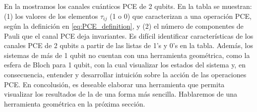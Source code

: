 En la  mostramos los canales 
cuánticos PCE de 2 qubits. En la tabla se muestran: 
(1) los valores de los elementos $\tau_{ij}$ (1 o 0) que caracterizan 
a una operación PCE, según la definición en \eqref{eq:PCE_definition},
y (2) el número de componentes de Pauli que el canal PCE
deja invariantes. Es difícil identificar características de los canales 
PCE de 2 qubits a partir de las listas de 1's y 0's en la tabla. 
Además, los sistemas de más de 1 qubit no cuentan con una herramienta 
geométrica, como la esfera de Bloch para 1 qubit, 
con la cual visualizar los estados del sistema y, en consecuencia, entender y 
desarrollar intuición sobre la acción de las operaciones PCE. 
En concolusión, es deseable elaborar una herramienta
que permita visualizar los resultados de la 
de una forma más sencilla. Hablaremos de una herramienta geométrica
en la próxima sección.

